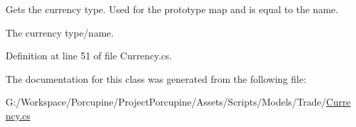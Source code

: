 Gets the currency type. Used for the prototype map and is equal to the name. 

The currency type/name.

Definition at line 51 of file Currency.\+cs.



The documentation for this class was generated from the following file\+:\begin{DoxyCompactItemize}
\item 
G\+:/\+Workspace/\+Porcupine/\+Project\+Porcupine/\+Assets/\+Scripts/\+Models/\+Trade/\hyperlink{_currency_8cs}{Currency.\+cs}\end{DoxyCompactItemize}
